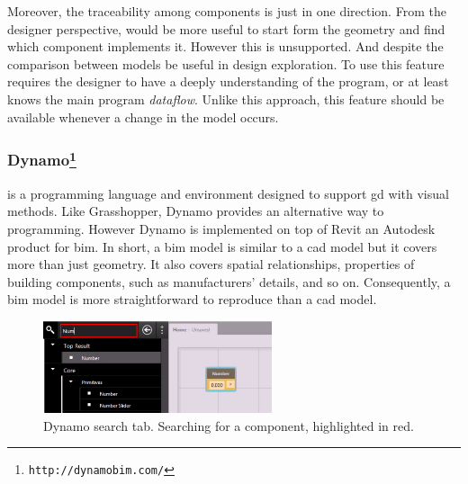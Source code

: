 Moreover, the traceability among components is just in one direction. From the designer perspective, would be more useful to start form the geometry and find which component implements it. However this is unsupported. And despite the comparison between models be useful in design exploration. To use this feature requires the designer to have a deeply understanding of the program, or at least knows the main program \textit{dataflow}. Unlike this approach, this feature should be available whenever a change in the model occurs.
\subsubsection{Dynamo\protect\footnote{\texttt{http://dynamobim.com/}}} is a programming language and environment designed to support \ac{gd} with visual methods. Like Grasshopper, Dynamo provides an alternative way to programming. However Dynamo is implemented on top of Revit an Autodesk product for \ac{bim}. In short, a \ac{bim} model is similar to a \ac{cad} model but it covers more than just geometry. It also covers spatial relationships, properties of building components, such as manufacturers' details, and so on. Consequently, a \ac{bim} model is more straightforward to reproduce than a \ac{cad} model. 

\begin{figure}
  \vspace{-10pt}
  \begin{center}
    \includegraphics[width=0.6\textwidth]{img/dynam-tab}
  \end{center}
  \vspace{-20pt}
 \caption{Dynamo search tab. Searching for a component, highlighted in red.}  
  \vspace{-15pt}
    \label{fig:dynam}
\end{figure}

